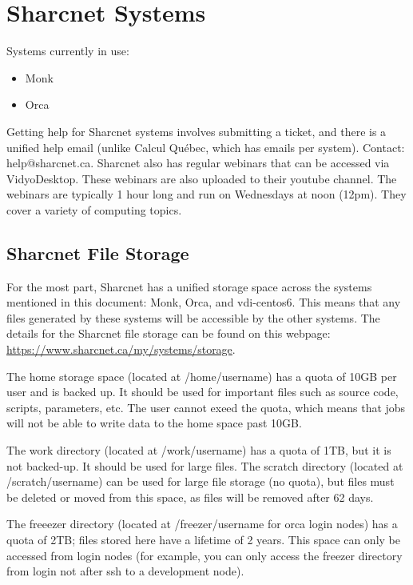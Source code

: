 \documentclass[12pt]{article}
\begin{document}
\newpage

\section{Sharcnet Systems}\label{Sharc}

\quad Systems currently in use:
\begin{itemize}
\item Monk
\item Orca
\end{itemize}

\quad Getting help for Sharcnet systems involves submitting a ticket, and there is a unified help email (unlike Calcul Qu\'{e}bec, which has emails per system). Contact: help@sharcnet.ca. Sharcnet also has regular webinars that can be accessed via VidyoDesktop. These webinars are also uploaded to their youtube channel. The webinars are typically 1 hour long and run on Wednesdays at noon (12pm). They cover a variety of computing topics.

\subsection{Sharcnet File Storage}
\quad For the most part, Sharcnet has a unified storage space across the systems mentioned in this document: Monk, Orca, and vdi-centos6. This means that any files generated by these systems will be accessible by the other systems. The details for the Sharcnet file storage can be found on this webpage: \url{https://www.sharcnet.ca/my/systems/storage}. 

\quad The home storage space (located at /home/username) has a quota of 10GB per user and is backed up. It should be used for important files such as source code, scripts, parameters, etc. The user cannot exeed the quota, which means that jobs will not be able to write data to the home space past 10GB. 

\quad The work directory (located at /work/username) has a quota of 1TB, but it is not backed-up. It should be used for large files. The scratch directory (located at /scratch/username) can be used for large file storage (no quota), but files must be deleted or moved from this space, as files will be removed after 62 days. 

\quad The freeezer directory (located at /freezer/username for orca login nodes) has a quota of 2TB; files stored here have a lifetime of 2 years. This space can only be accessed from login nodes (for example, you can only access the freezer directory from login not after ssh to a development node).
\end{document}
